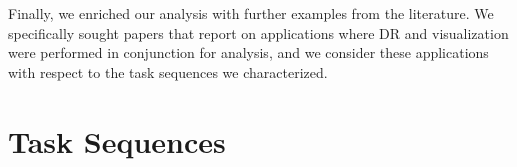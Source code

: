 Finally, we enriched our analysis with further examples from the literature.
We specifically sought papers that report on applications where \ac{DR} and visualization were performed in conjunction for analysis, and we consider these applications with respect to the task sequences we characterized. 


\section{Task Sequences}
\label{drvistasks:tasks}



